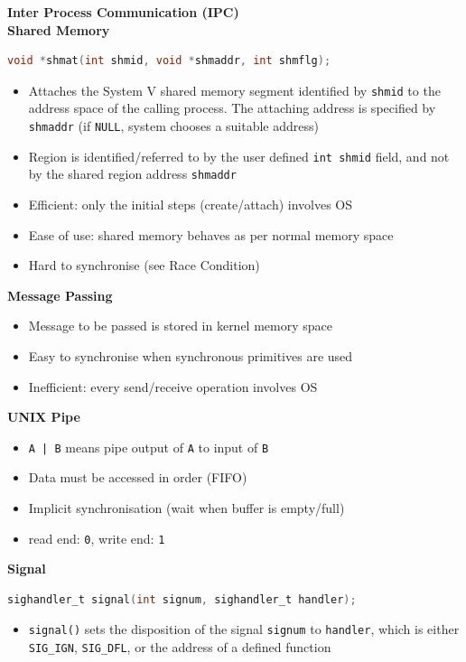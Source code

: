 \documentclass[a4paper, 12pt]{article}
\begin{document}
\begin{multicols*}{3}
{\small\textbf{Inter Process Communication (IPC)}} \\
\textbf{Shared Memory}
\begin{lstlisting}[language=C]
void *shmat(int shmid, void *shmaddr, int shmflg);
\end{lstlisting}
\begin{itemize}
	\item Attaches the System V shared memory segment identified by \texttt{shmid} to the address space of the calling process. The attaching address is specified by \texttt{shmaddr} (if \texttt{NULL}, system chooses a suitable address)
	\item Region is identified/referred to by the user defined \texttt{int shmid} field, and not by the shared region address \texttt{shmaddr}
	\item Efficient: only the initial steps (create/attach) involves OS
	\item Ease of use: shared memory behaves as per normal memory space
	\item Hard to synchronise (see Race Condition)
\end{itemize}
\textbf{Message Passing}
\begin{itemize}
	\item Message to be passed is stored in kernel memory space
	\item Easy to synchronise when synchronous primitives are used
	\item Inefficient: every send/receive operation involves OS
\end{itemize}
\textbf{UNIX Pipe}
\begin{itemize}
	\item \texttt{A | B} means pipe output of \texttt{A} to input of \texttt{B}
	\item Data must be accessed in order (FIFO)
	\item Implicit synchronisation (wait when buffer is empty/full)
	\item read end: \texttt{0}, write end: \texttt{1}
\end{itemize}
\textbf{Signal}
\begin{lstlisting}[language=C]
sighandler_t signal(int signum, sighandler_t handler);
\end{lstlisting}
\begin{itemize}
	\item \texttt{signal()} sets the disposition of the signal \texttt{signum} to \texttt{handler}, which is either \texttt{SIG\_IGN}, \texttt{SIG\_DFL}, or the address of a defined function
\end{itemize}


\end{multicols*}
\end{document}
